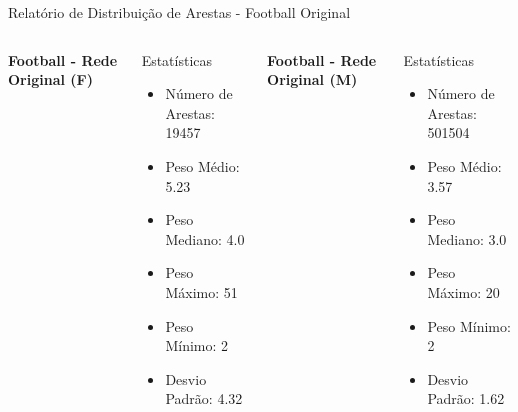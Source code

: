 \begin{frame}{Relatório de Distribuição de Arestas - Football Original}
    \begin{columns}
        \textbf{Football - Rede Original (F)}
        \begin{block}{Estatísticas}
            \begin{itemize}
                \item Número de Arestas: 19457
                \item Peso Médio: 5.23
                \item Peso Mediano: 4.0
                \item Peso Máximo: 51
                \item Peso Mínimo: 2
                \item Desvio Padrão: 4.32
            \end{itemize}
        \end{block}

        \textbf{Football - Rede Original (M)}
        \begin{block}{Estatísticas}
            \begin{itemize}
                \item Número de Arestas: 501504
                \item Peso Médio: 3.57
                \item Peso Mediano: 3.0
                \item Peso Máximo: 20
                \item Peso Mínimo: 2
                \item Desvio Padrão: 1.62
            \end{itemize}
        \end{block}
    \end{columns}
\end{frame}
